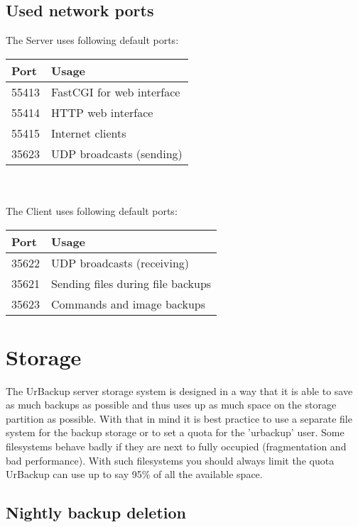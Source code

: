 \documentclass[a4paper,10pt]{article}
\begin{document}
\subsection{Used network ports}
\label{sec:ports}

The Server uses following default ports:

\begin{tabular}{|p{}|p{}|}
\hline
Port  & Usage \\
\hline
55413 & FastCGI for web interface \\
\hline
55414 & HTTP web interface \\
\hline
55415 & Internet clients \\
\hline
35623 & UDP broadcasts (sending) \\
\hline
\end{tabular}\\\\

\noindent The Client uses following default ports:

\begin{tabular}{|p{}|p{}|}
\hline
Port  & Usage \\
\hline
35622 & UDP broadcasts (receiving) \\
\hline
35621 & Sending files during file backups \\
\hline
35623 & Commands and image backups \\
\hline
\end{tabular}

\section{Storage}

The UrBackup server storage system is designed in a way that it is able to save
as much backups as possible and thus uses up as much space on the storage
partition as possible. With that in mind it is best practice to use a separate
file system for the backup storage or to set a quota for the 'urbackup' user.
Some filesystems behave badly if they are next to fully occupied (fragmentation
and bad performance). With such filesystems you should always limit the quota
UrBackup can use up to say 95\% of all the available space.

\subsection{Nightly backup deletion}
\end{document}
